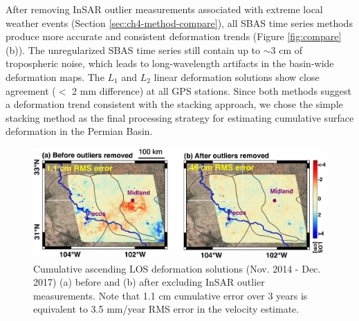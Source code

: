 After removing InSAR outlier measurements associated with extreme local weather events (Section \ref{sec:ch4-method-compare}), all SBAS time series methods produce more accurate and consistent deformation trends (Figure \ref{fig:compare} (b)). The unregularized SBAS time series still contain up to $\sim$3 cm of tropospheric noise, which leads to long-wavelength artifacts in the basin-wide deformation maps. The $ L_1 $ and $ L_2 $ linear deformation solutions show close agreement ($<$ 2 mm difference) at all GPS stations. Since both methods suggest a deformation trend consistent with the stacking approach, we chose the simple stacking method as the final processing strategy for estimating cumulative surface deformation in the Permian Basin.



\begin{figure}
	\centering
	\includegraphics[width=0.99\linewidth]{figures/chapter4-grl/outlier-bottom-only.pdf}
	\caption[Tropospheric outlier removal comparison]{
		Cumulative ascending LOS deformation solutions (Nov. 2014 - Dec. 2017) 
		(a) before and (b) after excluding InSAR outlier measurements. Note that 1.1 cm cumulative error over 3 years is equivalent to 3.5 mm/year RMS error in the velocity estimate.}
	\label{fig:ch4-outliers-visual}
\end{figure}


%


